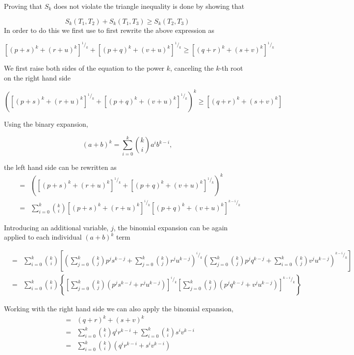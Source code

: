 Proving that $S_{k}$ does not violate the triangle inequality is done by showing that

\[
S_{k}(T_{1},T_{2})+S_{k}(T_{1},T_{3})\geq S_{k}(T_{2},T_{3})
\]
In order to do this we first use  to first rewrite the above expression as

\[
\left[\left(p+s\right)^{k} + \left(r+u\right)^{k}\right]^{^1/_k} + \left[\left(p+q\right)^{k} + \left(v+u\right)^{k}\right]^{^1/_k}\geq\left[\left(q+r\right)^{k}+\left(s+v\right)^{k}\right]^{^1/_k}
\]

We first raise both sides of the equation to the power $k$, canceling the $k$-th root on the right hand side

\[
\left(\left[\left(p+s\right)^{k} + \left(r+u\right)^{k}\right]^{^1/_k} + \left[\left(p+q\right)^{k} + \left(v+u\right)^{k}\right]^{^1/_k}\right)^k \geq \left[\left(q+r\right)^{k}+\left(s+v\right)^{k}\right]
\]

Using the binary expansion,

\[
(a+b)^k=\sum_{i=0}^{k} \binom{k}{i} a^{i}b^{k-i},
\]

the left hand side can be rewritten as
\begin{eqnarray*}
& = & \left(\left[\left(p+s\right)^{k} + \left(r+u\right)^{k}\right]^{^1/_k} + \left[\left(p+q\right)^{k} + \left(v+u\right)^{k}\right]^{^1/_k}\right)^k \\
& = & \sum_{i=0}^{k} \binom{k}{i} \left[\left(p+s\right)^{k} + \left(r+u\right)^{k}\right]^{^i/_k}  \left[\left(p+q\right)^{k} + \left(v+u\right)^{k}\right]^{^{k-i}/_k}
\end{eqnarray*}

Introducing an additional variable, $j$, the binomial expansion can be again applied to each individual $\left(a+b\right)^{k}$ term

\begin{eqnarray*}
& = & \sum_{i=0}^{k} \binom{k}{i} \left[ \left( \sum_{j=0}^{k} \binom{k}{j} p^{j}s^{k-j} + \sum_{j=0}^{k} \binom{k}{j} r^{j}u^{k-j} \right)^{^i/_k}  \left( \sum_{j=0}^{k} \binom{k}{j} p^{j}q^{k-j} + \sum_{i=0}^{k} \binom{k}{j} v^{j}u^{k-j} \right)^{^{k-i}/_k} \right]\\
& = & \sum_{i=0}^{k} \binom{k}{i} \left\{  \left[ \sum_{j=0}^{k} \binom{k}{j} \left( p^{j}s^{k-j} +  r^{j}u^{k-j} \right) \right]^{^i/_k}  \left[ \sum_{j=0}^{k} \binom{k}{j} \left( p^{j}q^{k-j} + v^{j}u^{k-j} \right) \right]^{^{k-i}/_k} \right\}
\end{eqnarray*}


Working with the right hand side we can also apply the binomial expansion,
\begin{eqnarray*}
& = & \left(q+r\right)^{k}+\left(s+v\right)^{k}\\
& = & \sum_{i=0}^{k} \binom{k}{i} q^{i}r^{k-i} + \sum_{i=0}^{k} \binom{k}{i} s^{i}v^{k-i}\\
& = & \sum_{i=0}^{k} \binom{k}{i} \left( q^{i}r^{k-i} +  s^{i}v^{k-i} \right)
\end{eqnarray*}

